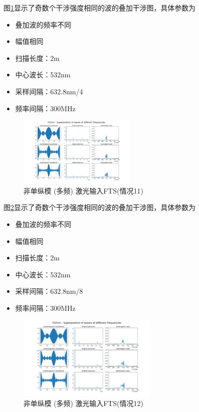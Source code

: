 \documentclass[conference]{IEEEtran}
\begin{document}
图\ref{pic20}显示了奇数个干涉强度相同的波的叠加干涉图，具体参数为
\begin{itemize}
    \item 叠加波的频率不同
    \item 幅值相同
    \item 扫描长度：2m
    \item 中心波长：532nm
    \item 采样间隔：632.8nm/4
    \item 频率间隔：300MHz
\end{itemize}
\begin{figure}[htbp]
    \centerline{\includegraphics[width=0.5\textwidth]{pic20.png}}
    \caption{非单纵模 (多频) 激光输入FTS(情况11)}
    \label{pic20}
\end{figure}

图\ref{pic21}显示了奇数个干涉强度相同的波的叠加干涉图，具体参数为
\begin{itemize}
    \item 叠加波的频率不同
    \item 幅值相同
    \item 扫描长度：2m
    \item 中心波长：532nm
    \item 采样间隔：632.8nm/8
    \item 频率间隔：300MHz
\end{itemize}
\begin{figure}[htbp]
    \centerline{\includegraphics[width=0.6\textwidth]{pic21.png}}
    \caption{非单纵模 (多频) 激光输入FTS(情况12)}
    \label{pic21}
\end{figure}
\end{document}

